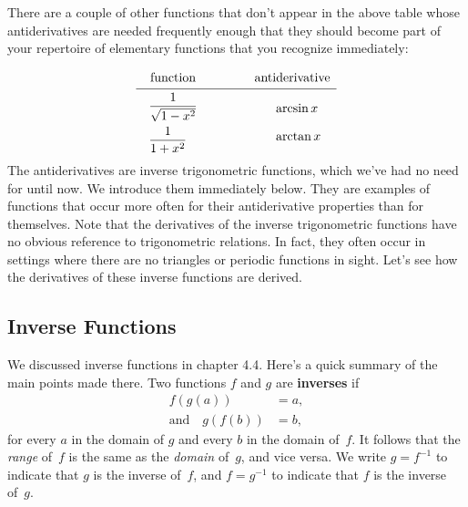 There are a couple of other functions that don't appear in the above
table whose antiderivatives are needed frequently enough that they
should become part of your repertoire of elementary functions that you
recognize immediately:



\mbox{}
\[
\begin{array}{ccc}
	\mbox{function} & \qquad &	\mbox{antiderivative} \\[2pt]
	\hline \\ [-9pt]
	\begin{array}{l}
		\dfrac{1}{\sqrt{1-x^2}}	\\ [10pt]
		\dfrac{1}{1+x^2}\label{arcsin deriv}	
	\end{array} 
	& & 
	\begin{array}{l} 
		\hphantom{-} \arcsin{x} \\ [10pt]
		\hphantom{-} \arctan{x}  
	\end{array}
	\end{array}
\] 
The antiderivatives are inverse trigonometric functions, which we've
had no need for until now.  We introduce them immediately below.  They
are examples of functions that occur more often for their
antiderivative properties than for themselves.  Note that the
derivatives of the inverse trigonometric functions have no obvious
reference to trigonometric relations.  In fact, they often occur in
settings where there are no triangles or periodic functions in sight.
Let's see how the derivatives of these inverse functions are derived.

\subsection{Inverse Functions}
\label{subsec:inverse-functions}

We discussed inverse functions in chapter 4.4.  Here's a quick summary
of the main points made there.  Two functions $f$ and $g$ are {\bf
  inverses} if
\begin{align*}
f(g(a)) &= a,  \\
\text{and} \quad g(f(b)) &= b,
\end{align*}
for every $a$ in the domain of $g$ and every $b$ in the
domain of~$f$.  It follows that the {\em range} of~$f$ is the same as
the {\em domain} of~$g$, and vice versa.  We write $g = f^{-1}$ to
indicate that $g$ is the inverse of~$f$, and $f = g^{-1}$ to indicate
that $f$ is the inverse of~$g$.

